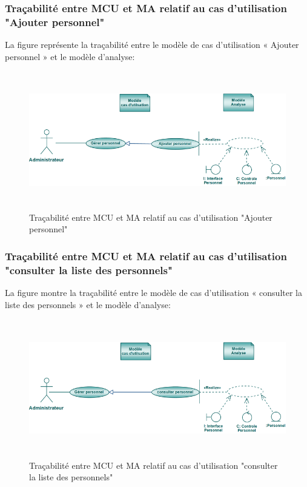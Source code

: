 \documentclass[12 pt ]{report}
\begin{document}
\subsubsection{Traçabilité entre MCU et MA relatif au cas d’utilisation "Ajouter personnel" }
La figure  représente la traçabilité entre le modèle de cas d’utilisation « Ajouter personnel » et le modèle
d’analyse:
\begin{figure}[h]
\begin{center}
\includegraphics[width= 14cm , height =6cm]{tap.png}
\caption{Traçabilité entre MCU et MA relatif au cas d’utilisation "Ajouter personnel"}
\end{center}
\end{figure}
\subsubsection{Traçabilité entre MCU et MA relatif au cas d’utilisation "consulter la liste des personnels" }
La figure  montre la traçabilité entre le modèle de cas d’utilisation « consulter la liste des personnels » et le modèle
d’analyse:
\begin{figure}[h]
\begin{center}
\includegraphics[width= 14cm , height =6cm]{traconsabs.png}
\caption{Traçabilité entre MCU et MA relatif au cas d’utilisation "consulter la liste des personnels"}
\end{center}
\end{figure} 
\end{document}
